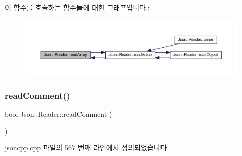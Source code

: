 이 함수를 호출하는 함수들에 대한 그래프입니다.\+:\nopagebreak
\begin{figure}[H]
\begin{center}
\leavevmode
\includegraphics[width=350pt]{class_json_1_1_reader_afd9a30c0af205c9f327613f486fae6b8_icgraph}
\end{center}
\end{figure}
\mbox{\label{class_json_1_1_reader_ad2690e860a1b3332c5401fb0850ba065}} 
\subsubsection{\texorpdfstring{read\+Comment()}{readComment()}}
{\footnotesize\ttfamily bool Json\+::\+Reader\+::read\+Comment (\begin{DoxyParamCaption}{ }\end{DoxyParamCaption})\hspace{0.3cm}{\ttfamily [private]}}



jsoncpp.\+cpp 파일의 567 번째 라인에서 정의되었습니다.


